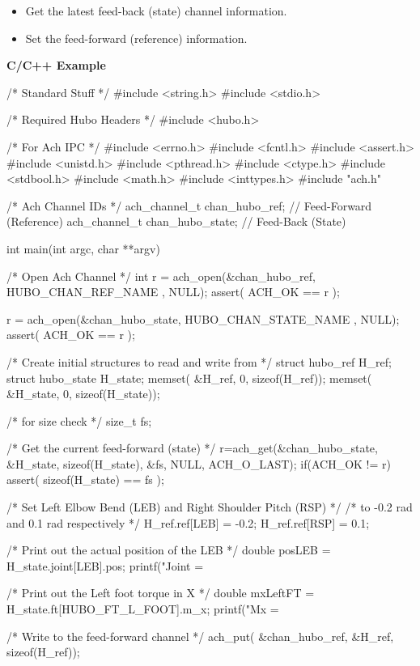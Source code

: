 \begin{itemize}
\item Get the latest feed-back (state) channel information.
\item Set the feed-forward (reference) information.
\end{itemize}


\footnotesize
\noindent \textbf{C/C++ Example}
\vspace{-6mm}
\begin{code}
/* Standard Stuff */
#include <string.h>
#include <stdio.h>

/* Required Hubo Headers */
#include <hubo.h>

/* For Ach IPC */
#include <errno.h>
#include <fcntl.h>
#include <assert.h>
#include <unistd.h>
#include <pthread.h>
#include <ctype.h>
#include <stdbool.h>
#include <math.h>
#include <inttypes.h>
#include "ach.h"


/* Ach Channel IDs */
ach_channel_t chan_hubo_ref;      // Feed-Forward (Reference)
ach_channel_t chan_hubo_state;    // Feed-Back (State)

int main(int argc, char **argv) {

    /* Open Ach Channel */
    int r = ach_open(&chan_hubo_ref, HUBO_CHAN_REF_NAME , NULL);
    assert( ACH_OK == r );

    r = ach_open(&chan_hubo_state, HUBO_CHAN_STATE_NAME , NULL);
    assert( ACH_OK == r );



    /* Create initial structures to read and write from */
    struct hubo_ref H_ref;
    struct hubo_state H_state;
    memset( &H_ref,   0, sizeof(H_ref));
    memset( &H_state, 0, sizeof(H_state));

    /* for size check */
    size_t fs;

    /* Get the current feed-forward (state) */
    r=ach_get(&chan_hubo_state, &H_state, sizeof(H_state), &fs, NULL, ACH_O_LAST);
    if(ACH_OK != r) {
        assert( sizeof(H_state) == fs );
    }

    /* Set Left Elbow Bend (LEB) and Right Shoulder Pitch (RSP) */
    /* to  -0.2 rad and 0.1 rad respectively */
    H_ref.ref[LEB] = -0.2;
    H_ref.ref[RSP] = 0.1;

    /* Print out the actual position of the LEB */
    double posLEB = H_state.joint[LEB].pos;
    printf("Joint = %

    /* Print out the Left foot torque in X */
    double mxLeftFT = H_state.ft[HUBO_FT_L_FOOT].m_x;
    printf("Mx = %

    /* Write to the feed-forward channel */
    ach_put( &chan_hubo_ref, &H_ref, sizeof(H_ref));

}

\end{code}
\normalsize












